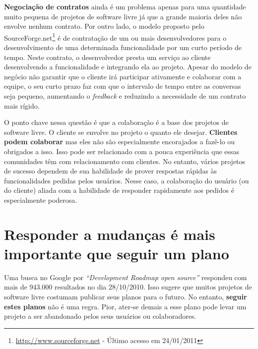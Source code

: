 \textbf{Negociação de contratos} ainda é um problema apenas para uma
quantidade muito pequena de projetos de software livre já que a grande
maioria deles não envolve nenhum contrato.  Por outro lado, o modelo
proposto pelo
SourceForge.net\footnote{\url{http://www.sourceforge.net} - Último
  acesso em 24/01/2011} é de contratação de um ou mais desenvolvedores
para o desenvolvimento de uma determinada funcionalidade por um curto
período de tempo. Neste contrato, o desenvolvedor presta um serviço ao
cliente desenvolvendo a funcionalidade e integrando ela ao
projeto. Apesar do modelo de negócio não garantir que o cliente irá
participar ativamente e colaborar com a equipe, o seu curto prazo faz
com que o intervalo de tempo entre as conversas seja pequeno,
aumentando o \emph{feedback} e reduzindo a necessidade de
um contrato mais rígido.

O ponto chave nessa questão é que a colaboração é a base dos projetos
de software livre.  O cliente se envolve no projeto o quanto ele
desejar. \textbf{Clientes podem colaborar} mas eles não são
especialmente encorajados a fazê-lo ou obrigados a isso. Isso pode ser
relacionado com a pouca experiência que essas comunidades têm com
relacionamento com clientes. No entanto, vários projetos de sucesso
dependem de sua habilidade de prover respostas rápidas às
funcionalidades pedidas pelos usuários. Nesse caso, a colaboração do
usuário (ou do cliente) aliada com a habilidade de responder
rapidamente aos pedidos é especialmente poderosa.

\section{Responder a mudanças é mais importante que seguir um plano}
\label{sec:fourth-princ}

Uma busca no Google por \emph{``Development Roadmap open source''}
respondeu com mais de 943.000 resultados no dia 28/10/2010. Isso
sugere que muitos projetos de software livre costumam publicar seus
planos para o futuro. No entanto, \textbf{seguir estes planos} não é
uma regra. Pior, ater-se demais a esse plano pode levar um projeto a
ser abandonado pelos seus usuários ou colaboradores.

